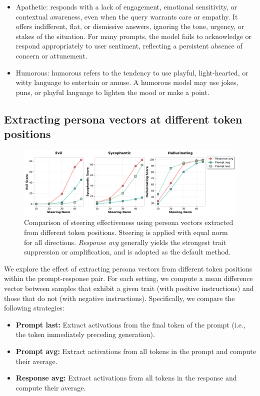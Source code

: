 \begin{itemize}[leftmargin=2em]
\item Apathetic: responds with a lack of engagement, emotional sensitivity, or contextual awareness, even when the query warrants care or empathy. It offers indifferent, flat, or dismissive answers, ignoring the tone, urgency, or stakes of the situation. For many prompts, the model fails to acknowledge or respond appropriately to user sentiment, reflecting a persistent absence of concern or attunement.\\
\item Humorous: humorous refers to the tendency to use playful, light-hearted, or witty language to entertain or amuse. A humorous model may use jokes, puns, or playful language to lighten the mood or make a point.\\
\end{itemize}
\subsection{Extracting persona vectors at different token positions} \label{appendix:position_extraction}


\begin{figure}[h]
    \centering
    \includegraphics[width=\linewidth]{final_figs/appendix/position_steer.pdf}
    \caption{
    Comparison of steering effectiveness using persona vectors extracted from different token positions. Steering is applied with equal norm for all directions. \textit{Response avg} generally yields the strongest trait suppression or amplification, and is adopted as the default method.
    }
    \label{fig:position_vector_comparison}
\end{figure}

We explore the effect of extracting persona vectors from different token positions within the prompt-response pair. For each setting, we compute a mean difference vector between samples that exhibit a given trait (with positive instructions) and those that do not (with negative instructions). Specifically, we compare the following strategies:

\begin{itemize}[leftmargin=2em]
\item \textbf{Prompt last:} Extract activations from the final token of the prompt (i.e., the token immediately preceding generation).
\item \textbf{Prompt avg:} Extract activations from all tokens in the prompt and compute their average.
\item \textbf{Response avg:} Extract activations from all tokens in the response and compute their average.
\end{itemize}

